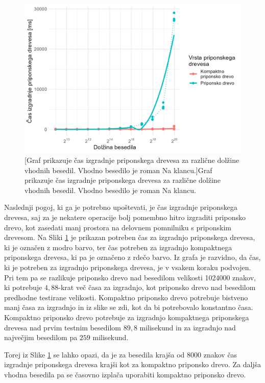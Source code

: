\begin{figure}[htb]
    \includegraphics[width=\textwidth]{Slike/izgradnjaDrecvesaNovPCSLO.png}
    [Graf prikazuje čas izgradnje priponskega drevesa za različne dolžine vhodnih besedil. Vhodno besedilo je roman Na klancu.]{Graf prikazuje čas izgradnje priponskega drevesa za različne dolžine vhodnih besedil. Vhodno besedilo je roman Na klancu.} 
    \label{fig:IzgradnjaGrafSLO}
\end{figure}

Naslednji pogoj, ki ga je potrebno upoštevati, je čas izgradnje priponskega drevesa, saj za je nekatere operacije bolj pomembno hitro izgraditi priponsko drevo, kot zasedati manj prostora na delovnem pomnilniku s priponskim drevesom. Na Sliki \ref{fig:IzgradnjaGrafSLO} je prikazan potreben čas za izgradnjo priponskega drevesa, ki je označen z modro barvo, ter čas potreben za izgradnjo kompaktnega priponskega drevesa, ki pa je označeno z rdečo barvo. Iz grafa je razvidno, da čas, ki je potreben za izgradnjo priponskega drevesa, je v vsakem koraku podvojen. Pri tem pa se razlikuje priponsko drevo nad besedilom velikosti 1024000 znakov, ki potrebuje $4,88$-krat več časa za izgradnjo, kot priponsko drevo nad besedilom predhodne testirane velikosti. Kompaktno priponsko drevo potrebuje bistveno manj časa za izgradnjo in iz slike se zdi, kot da bi potrebovalo konstantno časa. Kompaktno priponsko drevo potrebuje za izgradnjo kompaktnega priponskega drevesa nad prvim testnim besedilom $89,8$ milisekund in za izgradnjo nad največjim besedilom pa $259$ milisekund.

Torej iz Slike \ref{fig:IzgradnjaGrafSLO} se lahko opazi, da je za besedila krajša od 8000 znakov čas izgradnje priponskega drevesa krajši kot za kompaktno priponsko drevo. Za daljša vhodna besedila pa se časovno izplača uporabiti kompaktno priponsko drevo.


